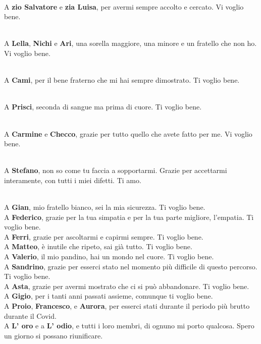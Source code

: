 \documentclass[main]{subfiles}
\begin{document}
\noindent\\
A \textbf{zio Salvatore} e \textbf{zia Luisa}, per avermi sempre accolto e cercato. Vi voglio bene.

\noindent\\
A \textbf{Lella}, \textbf{Nichi} e \textbf{Ari}, una sorella maggiore, una minore e un fratello che non ho. Vi voglio bene.

\noindent\\
A \textbf{Cami}, per il bene fraterno che mi hai sempre dimostrato. Ti voglio bene.

\noindent\\
A \textbf{Prisci}, seconda di sangue ma prima di cuore. Ti voglio bene.

\noindent\\
A \textbf{Carmine} e \textbf{Checco}, grazie per tutto quello che avete fatto per me. Vi voglio bene.

\noindent\\
A \textbf{Stefano}, non so come tu faccia a sopportarmi. Grazie per accettarmi interamente, 
con tutti i miei difetti. Ti amo.

\noindent\\
A \textbf{Gian}, mio fratello bianco, sei la mia sicurezza. Ti voglio bene.
\noindent\\
A \textbf{Federico}, grazie per la tua simpatia e per la tua parte migliore, l'empatia. Ti voglio bene.
\noindent\\
A \textbf{Ferri}, grazie per ascoltarmi e capirmi sempre. Ti voglio bene.
\noindent\\
A \textbf{Matteo}, è inutile che ripeto, sai già tutto. Ti voglio bene.
\noindent\\
A \textbf{Valerio}, il mio pandino, hai un mondo nel cuore. Ti voglio bene.
\noindent\\
A \textbf{Sandrino}, grazie per esserci stato nel momento più difficile di questo percorso. Ti voglio bene.
\noindent\\
A \textbf{Asta}, grazie per avermi mostrato che ci si può abbandonare. Ti voglio bene.
\noindent\\
A \textbf{Gigio}, per i tanti anni passati assieme, comunque ti voglio bene.
\noindent\\
A \textbf{Proio}, \textbf{Francesco}, e \textbf{Aurora}, per esserci stati durante il periodo più
brutto durante il Covid.
\noindent\\
A \textbf{L' oro} e a \textbf{L' odio}, e tutti i loro membri, di ognuno mi porto qualcosa.
Spero un giorno si possano riunificare. 
\end{document}
